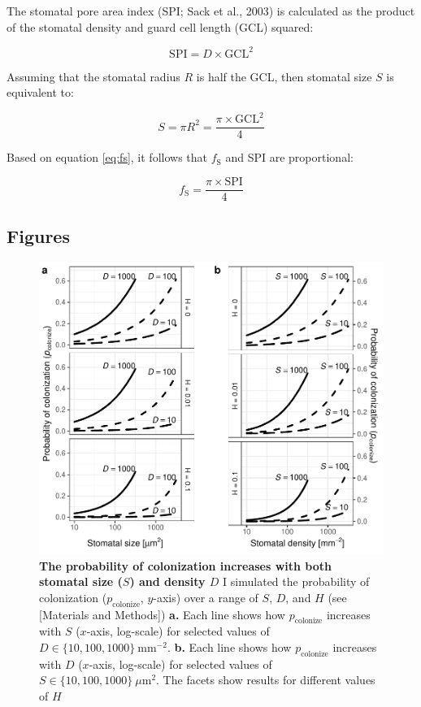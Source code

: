 \documentclass[utf8]{frontiersSCNS}
\newcommand{\fs}{$f_\text{S}$}
\begin{document}
The stomatal pore area index (SPI; Sack et al., 2003) is calculated as
the product of the stomatal density and guard cell length (GCL) squared:

\begin{equation*}
  \mathrm{SPI} = D \times \mathrm{GCL} ^ 2
\end{equation*}

Assuming that the stomatal radius \(R\) is half the GCL, then stomatal
size \(S\) is equivalent to:

\begin{equation*}
  S = \pi R ^ 2 = \frac{\pi \times \mathrm{GCL} ^ 2}{4}
\end{equation*}

Based on equation \ref{eq:fs}, it follows that \fs{} and SPI are
proportional:

\begin{equation*}
  f_\text{S} = \frac{\pi \times \mathrm{SPI}}{4}
\end{equation*}

\clearpage

\hypertarget{figures}{%
\subsection*{Figures}\label{figures}}

\begin{figure}
  \centering
    \includegraphics{../figures/figS1.pdf}
    \caption{\textbf{The probability of colonization increases with both stomatal size ($S$) and density $D$} I simulated the probability of colonization ($p_\text{colonize}$, $y$-axis) over a range of $S$, $D$, and $H$ (see [Materials and Methods]) \textbf{a.} Each line shows how $p_\text{colonize}$ increases with $S$ ($x$-axis, log-scale) for selected values of $D \in \{10, 100, 1000\}~\text{mm}^{-2}$. \textbf{b.} Each line shows how $p_\text{colonize}$ increases with $D$ ($x$-axis, log-scale) for selected values of $S \in \{10, 100, 1000\}~\mu\text{m}^2$. The facets show results for different values of $H$}
    \label{fig:figS1}
\end{figure}
\end{document}
